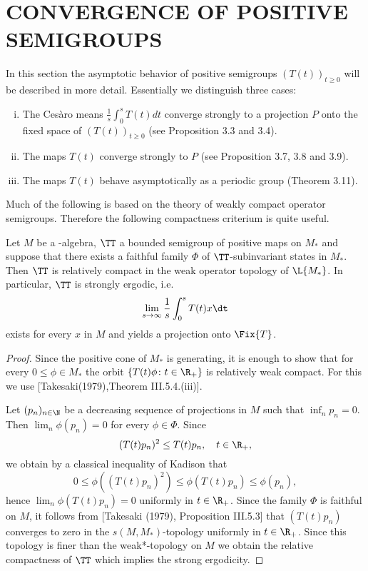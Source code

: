 \section{CONVERGENCE OF POSITIVE SEMIGROUPS}\label{sec:d4-3}

In this section the asymptotic behavior of positive semigroups $(T(t))_{t \geq 0}$ will be described in more detail.
Essentially we distinguish three cases:

\begin{enumerate}[(i)]
\item
The Cesàro means $\frac{1}{s}\int_{0}^{s} T(t)dt$ converge strongly to a projection $P$ onto the fixed space of $(T(t))_{t \geq 0}$ (see Proposition 3.3 and 3.4).

\item
The maps $T(t)$ converge strongly to $P$ (see Proposition 3.7, 3.8 and 3.9).

\item
The maps $T(t)$ behave asymptotically as a periodic group (Theorem 3.11).
\end{enumerate}
Much of the following is based on the theory of weakly compact operator semigroups.
Therefore the following compactness criterium is quite useful.
\begin{proposition}\label{prop:d4-3.1}
Let $M$ be a \WA-algebra, $\TT$ a bounded semigroup of positive maps on $M_{*}$ and suppose that there exists a faithful family $\Phi$ of\/ $\TT$-subinvariant states in $M_{*}$.
Then $\TT$ is relatively compact in the weak operator topology of $ \L{M_{*}} $.
In particular, $\TT$ is strongly ergodic, i.e. 
%
\[
	\lim_{s \to \infty} \frac{1}{s}\int_{0}^{s} T(t)x \dt
\]
%
exists for every $x$ in $M$ and yields a projection onto $\Fix{T}$.
\end{proposition}
%
\begin{proof}
Since the positive cone of $M_{*}$ is generating, it is enough to show that for every $0 \leq \phi \in M_{*}$ the orbit $\{T(t)\phi \colon t \in \R_{+}\}$ is relatively weak compact.
For this we use [Takesaki(1979),Theorem III.5.4.(iii)].


\newpage

Let $(p_{n})_{n \in \N}$ be a decreasing sequence of projections in $M$ such that $\inf_{n} p_{n} = 0$.
Then $\lim_{n}\phi(p_{n}) = 0$ for every $\phi \in \Phi$.
Since
\[
	(T(t)p_{n})^2 \leq T(t)p_{n}, \quad t \in \R_{+},
\]
we obtain by a classical inequality of Kadison that
\[
0 \leq \phi((T(t)p_{n})^2) \leq \phi(T(t)p_{n}) \leq \phi(p_{n}),
\]
hence $\lim_{n}\phi(T(t)p_{n}) = 0$ uniformly in $t \in \R_{+}$.
Since the family $\Phi$ is faithful on $M$, it follows from [Takesaki (1979), Proposition III.5.3] that $(T(t)p_{n})$ converges to zero in the $s(M,M_{*})$-topology uniformly in $t \in \R_{+}$.
Since this topology is finer than the weak*-topology on $M$ we obtain the relative compactness of\/ $\TT$ which implies the strong ergodicity.
\end{proof}

